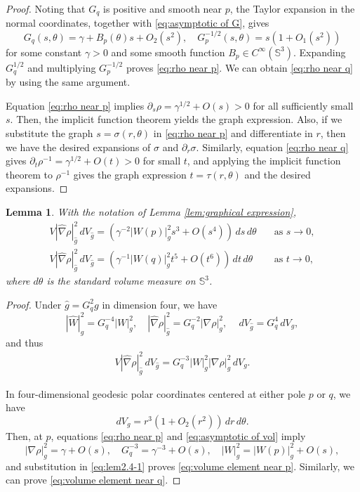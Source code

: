 \documentclass[11pt]{amsart}
\theoremstyle{plain}
\newtheorem{lemma}[theorem]{Lemma}
\numberwithin{equation}{section}
\renewcommand{\S}{\mathbb{S}}
\newcommand{\wh}[1]{\widehat{#1}}
\newcommand{\hn}{\widehat{\nabla}}
\newcommand{\hg}{\widehat{g}}
\newcommand{\dv}{\,dV_{\widehat{g}}}
\begin{document}
\begin{proof}
Noting that $G_q$ is positive and smooth near $p$, the Taylor expansion in the normal coordinates, together with \eqref{eq:asymptotic of G}, gives
\begin{equation*}
G_q(s,\theta)=\gamma+B_p(\theta)s+O_2(s^2),\quad G_p^{-1/2}(s,\theta)=s(1+O_1(s^2))
\end{equation*}
for some constant $\gamma>0$ and some smooth function $B_p\in C^\infty(\S^3)$. Expanding $G_q^{1/2}$ and multiplying $G_p^{-1/2}$ proves \eqref{eq:rho near p}. We can obtain \eqref{eq:rho near q} by using the same argument.

Equation \eqref{eq:rho near p} implies $\partial_s\rho=\gamma^{1/2}+O(s)>0$ for all sufficiently small $s$. Then, the implicit function theorem yields the graph expression. Also, if we substitute the graph $s=\sigma(r,\theta)$ in \eqref{eq:rho near p} and differentiate in $r$, then we have the desired expansions of $\sigma$ and $\partial_r\sigma$. Similarly, equation \eqref{eq:rho near q} gives $\partial_t\rho^{-1}=\gamma^{1/2}+O(t)>0$ for small $t$, and applying the implicit function theorem to $\rho^{-1}$ gives the graph expression $t=\tau(r,\theta)$ and the desired expansions. 
\end{proof}

\begin{lemma}
With the notation of Lemma \ref{lem:graphical expression},
\begin{align}
\label{eq:volume element near p}
V|\hn\rho|_{\hg}^2\dv=\left(\gamma^{-2}|W(p)|^2_gs^3+O(s^4)\right)\,ds\,d\theta&\quad\text{as $s\rightarrow0$},\\\label{eq:volume element near q}
V|\hn\rho|_{\hg}^2\dv=\left(\gamma^{-1}|W(q)|^2_g t^5+O(t^6)\right)\,dt\,d\theta&\quad\text{as $t\rightarrow0$},
\end{align}
where $d\theta$ is the standard volume measure on $\S^3$.
\end{lemma}

\begin{proof}
Under $\hg=G_q^2g$ in dimension four, we have
\begin{equation*}
|\wh{W}|_{\hg}^2=G_q^{-4}|W|_g^2,\quad |\hn \rho|_{\hg}^2=G_q^{-2}|\nabla \rho|_g^2,\quad \dv=G_q^4\,dV_g,
\end{equation*}
and thus
\begin{align}\label{eq:lem2.4-1}
V|\hn\rho|_{\hg}^2\dv=G_q^{-3}|W|^2_g|\nabla\rho|_g^2\,dV_g.
\end{align}

In four-dimensional geodesic polar coordinates centered at either pole $p$ or $q$, we have
\begin{equation}\label{eq:asymptotic of vol}
dV_g=r^{3}(1+O_2(r^2))\,dr\,d\theta.
\end{equation}
Then, at $p$, equations \eqref{eq:rho near p} and \eqref{eq:asymptotic of vol} imply
\begin{equation*}
|\nabla\rho|_g^2=\gamma+O(s),\quad G_q^{-3}=\gamma^{-3}+O(s),\quad |W|^2_g=|W(p)|^2_g+O(s),
\end{equation*}
and substitution in \eqref{eq:lem2.4-1} proves \eqref{eq:volume element near p}. Similarly, we can prove \eqref{eq:volume element near q}.
\end{proof}
\end{document}
